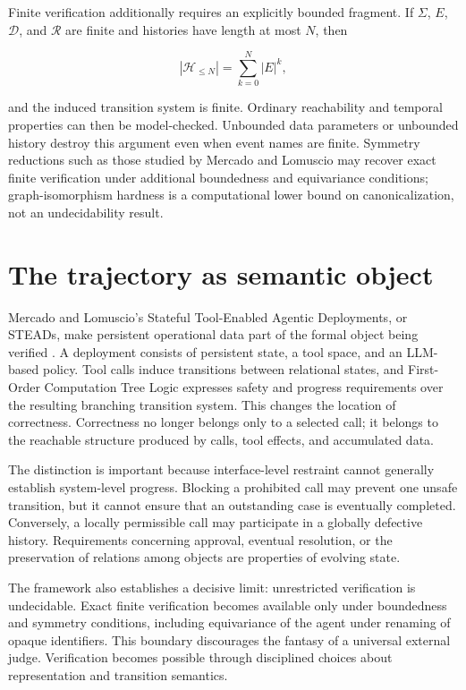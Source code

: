 \documentclass[11pt]{article}
\begin{document}
Finite verification additionally requires an explicitly bounded fragment. If $\Sigma$, $E$, $\mathcal D$, and $\mathcal R$ are finite and histories have length at most $N$, then

\begin{equation}
|\mathcal H_{\leq N}|
=
\sum_{k=0}^{N}|E|^k,
\end{equation}

and the induced transition system is finite. Ordinary reachability and temporal properties can then be model-checked. Unbounded data parameters or unbounded history destroy this argument even when event names are finite. Symmetry reductions such as those studied by Mercado and Lomuscio may recover exact finite verification under additional boundedness and equivariance conditions; graph-isomorphism hardness is a computational lower bound on canonicalization, not an undecidability result.

\section{The trajectory as semantic object}

Mercado and Lomuscio's Stateful Tool-Enabled Agentic Deployments, or STEADs, make persistent operational data part of the formal object being verified \cite{mercado2026}. A deployment consists of persistent state, a tool space, and an LLM-based policy. Tool calls induce transitions between relational states, and First-Order Computation Tree Logic expresses safety and progress requirements over the resulting branching transition system. This changes the location of correctness. Correctness no longer belongs only to a selected call; it belongs to the reachable structure produced by calls, tool effects, and accumulated data.

The distinction is important because interface-level restraint cannot generally establish system-level progress. Blocking a prohibited call may prevent one unsafe transition, but it cannot ensure that an outstanding case is eventually completed. Conversely, a locally permissible call may participate in a globally defective history. Requirements concerning approval, eventual resolution, or the preservation of relations among objects are properties of evolving state.

The framework also establishes a decisive limit: unrestricted verification is undecidable. Exact finite verification becomes available only under boundedness and symmetry conditions, including equivariance of the agent under renaming of opaque identifiers. This boundary discourages the fantasy of a universal external judge. Verification becomes possible through disciplined choices about representation and transition semantics.
\end{document}
